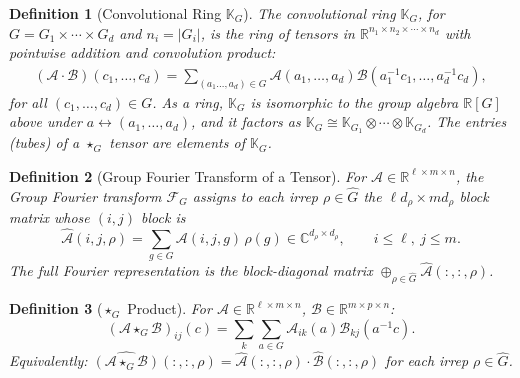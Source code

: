 \documentclass[10pt,a4paper]{amsart}
\newtheorem{definition}{Definition}
\newcommand{\bbC}{\mathbb{C}}
\newcommand{\bbR}{\mathbb{R}}
\newcommand{\calA}{\mathcal{A}}
\newcommand{\calB}{\mathcal{B}}
\newcommand{\starG}{\star_G}
\begin{document}
\begin{definition}[Convolutional Ring $\mathbb{K}_G$]\label{def:conv_ring}
The convolutional ring $\mathbb{K}_G$, for $G = G_1 \times \cdots \times G_d$ and $n_i = |G_i|$, is the ring of tensors in $\mathbb{R}^{n_1 \times n_2 \times \cdots \times n_d}$ with pointwise addition and convolution product:
\begin{align}\label{eq: group convolution of tensors}
    (\mathcal{A} \cdot \mathcal{B})(c_1, \ldots, c_d) = \sum_{(a_1 \ldots, a_d) \in G}
\mathcal{A}(a_1, \ldots, a_d) \mathcal{B}(a_1^{-1}c_1, \ldots, a_d^{-1}c_d),
\end{align}
for all $(c_1, \dots, c_d) \in G$. As a ring, $\mathbb{K}_G$ is isomorphic to
the group algebra $\bbR[G]$ above under $a \leftrightarrow (a_1, \ldots, a_d)$,
and it factors as
$\mathbb{K}_G \cong \mathbb{K}_{G_1} \otimes \cdots \otimes \mathbb{K}_{G_d}$.
The entries (tubes) of a $\starG$ tensor are elements of $\mathbb{K}_G$.
\end{definition}

\begin{definition}[Group Fourier Transform of a Tensor]\label{def:tensor_ft}
For $\calA \in \bbR^{\ell \times m \times n}$, the Group Fourier transform $\mathcal{F}_G$ assigns to each irrep $\rho \in \hat{G}$ the $\ell d_\rho \times m d_\rho$ block matrix whose $(i,j)$ block is
\begin{equation}
    \hat{\calA}(i,j,\rho) = \sum_{g \in G} \calA(i,j,g)\,\rho(g) \in \bbC^{d_\rho \times d_\rho}, \qquad i \le \ell,\ j \le m.
\end{equation}
The full Fourier representation is the block-diagonal matrix $\oplus_{\rho \in \hat{G}} \hat{\calA}(:,:,\rho)$.
\end{definition}

\begin{definition}[$\starG$ Product]\label{def:starg_product}
For $\calA \in \bbR^{\ell \times m \times n}$, $\calB \in \bbR^{m \times p \times n}$:
\begin{equation}
(\calA \starG \calB)_{ij}(c) = \sum_k \sum_{a \in G} \calA_{ik}(a) \calB_{kj}(a^{-1}c).
\end{equation}
Equivalently: $\widehat{(\calA \starG \calB)}(:,:,\rho) = \hat{\calA}(:,:,\rho) \cdot \hat{\calB}(:,:,\rho)$ for each irrep $\rho \in \hat{G}$.
\end{definition}
\end{document}
